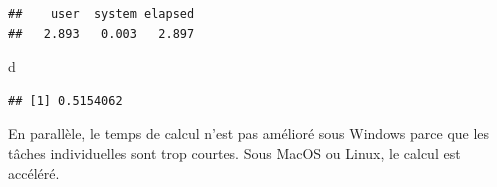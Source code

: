 \documentclass[
  12pt,
  french,
  a4paper,
  extrafontsizes,onecolumn,openright
  ]{memoir}
\newenvironment{Shaded}{\begin{snugshade}}{\end{snugshade}}
\newcommand{\ControlFlowTok}[1]{\textcolor[rgb]{0.13,0.29,0.53}{\textbf{#1}}}
\newcommand{\DecValTok}[1]{\textcolor[rgb]{0.00,0.00,0.81}{#1}}
\newcommand{\KeywordTok}[1]{\textcolor[rgb]{0.13,0.29,0.53}{\textbf{#1}}}
\newcommand{\NormalTok}[1]{#1}
\newcommand{\OperatorTok}[1]{\textcolor[rgb]{0.81,0.36,0.00}{\textbf{#1}}}
\newcommand{\StringTok}[1]{\textcolor[rgb]{0.31,0.60,0.02}{#1}}
\begin{document}
\begin{verbatim}
##    user  system elapsed 
##   2.893   0.003   2.897
\end{verbatim}

\begin{Shaded}
\begin{Highlighting}[]
\NormalTok{d}
\end{Highlighting}
\end{Shaded}

\begin{verbatim}
## [1] 0.5154062
\end{verbatim}

\normalsize

En parallèle, le temps de calcul n'est pas amélioré sous Windows parce que les tâches individuelles sont trop courtes.
Sous MacOS ou Linux, le calcul est accéléré.

\scriptsize

\begin{Shaded}
\end{Shaded}
\end{document}

